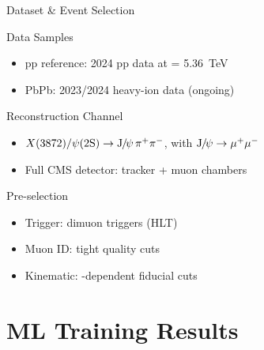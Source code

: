 \documentclass[11pt,aspectratio=169]{beamer}
\begin{document}
\begin{frame}{Dataset \& Event Selection}
  \begin{block}{Data Samples}
    \begin{itemize}
      \item pp reference: 2024 pp data at \sqrtsnn = 5.36~TeV
      \item PbPb: 2023/2024 heavy-ion data (ongoing)
    \end{itemize}
  \end{block}

  \begin{block}{Reconstruction Channel}
    \begin{itemize}
      \item $X(3872) / \psi\text{(2S)} \to \mathrm{J}\hspace{-.08em}/\hspace{-.14em}\psi \, \pi^{+}\pi^{-}$, with $\mathrm{J}\hspace{-.08em}/\hspace{-.14em}\psi \to \mu^{+}\mu^{-}$
      \item Full CMS detector: tracker + muon chambers
    \end{itemize}
  \end{block}

  \begin{block}{Pre-selection}
    \begin{itemize}
      \item Trigger: dimuon triggers (HLT)
      \item Muon ID: tight quality cuts
      \item Kinematic: \pt-dependent fiducial cuts
    \end{itemize}
  \end{block}
\end{frame}

\section{ML Training Results}
\end{document}
